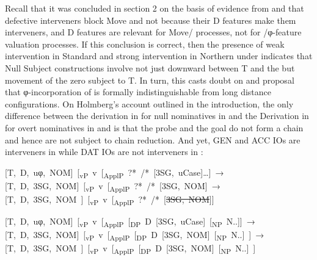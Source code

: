 \documentclass[output=paper]{LSP/langsci}
\begin{document}
Recall that it was concluded in section 2 on the basis of evidence from  and  that defective interveners block Move and not  because their D features make them interveners, and D features are relevant for Move/ processes, not for /φ-feature valuation processes. If this conclusion is correct, then the presence of weak intervention in Standard  and strong intervention in Northern  under  indicates that Null Subject constructions involve not just downward  between T and the  but movement of the zero subject to T. In turn, this casts doubt on  and  proposal that φ-incorporation of  is formally indistinguishable from long distance  configurations. On Holmberg’s account outlined in the introduction, the only difference between the  derivation in  for null nominatives in  and the  Derivation in  for overt nominatives in   and   is that the probe and the goal do not form a chain and hence are not subject to chain reduction. And yet, GEN and ACC IOs are interveners in  while  DAT IOs are not interveners in :    

\newpage
\ea%
\label{ex:anagnost:29}
\begin{xlistn}\let\exfont\small
\ex \mbox{[T, D, uφ, NOM] [\textsubscript{vP} v [\textsubscript{ApplP} ?* /*  [3SG, uCase]…] →}
\ex \mbox{[T, D, 3SG, NOM] [\textsubscript{vP} v [\textsubscript{ApplP} ?*  /*   [3SG, NOM] →}
\ex \mbox{[T, D, 3SG, NOM ] [\textsubscript{vP} v [\textsubscript{ApplP}  ?* /*   [\sout{3SG, NOM}]]}
\end{xlistn}
\z

\ea%
\label{ex:anagnost:30}
\begin{xlistn}\let\exfont\small
\ex \mbox{[T, D, uφ, NOM] [\textsubscript{vP} v [\textsubscript{ApplP}       [\textsubscript{DP} D [3SG, uCase] [\textsubscript{NP}  N..]] →}
\ex \mbox{[T, D, 3SG, NOM] [\textsubscript{vP} v [\textsubscript{ApplP}      [\textsubscript{DP} D [3SG, NOM] [\textsubscript{NP}  N..] ] → }
\ex \mbox{[T, D, 3SG, NOM ] [\textsubscript{vP} v [\textsubscript{ApplP}      [\textsubscript{DP} D [3SG, NOM]  [\textsubscript{NP}  N..] ]}
\end{xlistn}
\z
\end{document}
